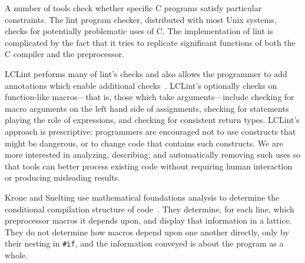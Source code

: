 \documentclass[11pt]{article}
\begin{document}
A number of tools check whether specific C programs
satisfy particular constraints.  The lint program checker, distributed
with most Unix systems, checks for potentially problematic uses of C\@.
The implementation of lint is complicated by the fact
that it tries to replicate significant functions of both the C
compiler and the preprocessor.

LCLint performs many of lint's checks and also
allows the programmer to add annotations which enable additional
checks~\cite{Evans-pldi96,Evans-fse94}.
LCLint's  optionally checks  on function-like
macros---that is, those which take arguments---include checking for
macro arguments on the left hand side of assignments, checking for statements
playing the role of expressions, and checking for consistent return types.
LCLint's approach is prescriptive: programmers are encouraged not to use
constructs that might be dangerous, or to change code that contains such
constructs.  We are more interested in analyzing, describing, and
automatically removing such uses so that tools can better process existing
code without requiring human interaction or producing misleading results.


Krone and Snelting use mathematical foundations analysis to determine the
conditional compilation structure of code~\cite{Krone94}.  They determine,
for each line, which preprocessor macros it depends upon, and display that
information in a lattice.  They do not determine how macros depend upon one
another directly, only by their nesting in {\tt \#if}, and the information
conveyed is about the program as a whole.
\end{document}

